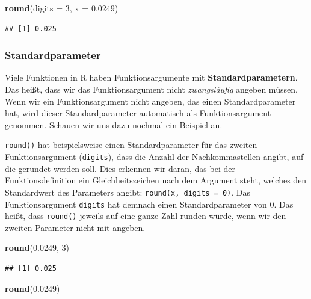 \documentclass[
  ngerman,
]{book}
\newenvironment{Shaded}{\begin{snugshade}}{\end{snugshade}}
\newcommand{\AttributeTok}[1]{\textcolor[rgb]{0.13,0.29,0.53}{#1}}
\newcommand{\DecValTok}[1]{\textcolor[rgb]{0.00,0.00,0.81}{#1}}
\newcommand{\FloatTok}[1]{\textcolor[rgb]{0.00,0.00,0.81}{#1}}
\newcommand{\FunctionTok}[1]{\textcolor[rgb]{0.13,0.29,0.53}{\textbf{#1}}}
\newcommand{\NormalTok}[1]{#1}
\begin{document}
\begin{Shaded}
\begin{Highlighting}[]
\FunctionTok{round}\NormalTok{(}\AttributeTok{digits =} \DecValTok{3}\NormalTok{, }\AttributeTok{x =} \FloatTok{0.0249}\NormalTok{)}
\end{Highlighting}
\end{Shaded}

\begin{verbatim}
## [1] 0.025
\end{verbatim}

\subsubsection{Standardparameter}\label{standardparameter}

Viele Funktionen in R haben Funktionsargumente mit \textbf{Standardparametern}. Das heißt, dass wir das Funktionsargument nicht \emph{zwangsläufig} angeben müssen. Wenn wir ein Funktionsargument nicht angeben, das einen Standardparameter hat, wird dieser Standardparameter automatisch als Funktionsargument genommen. Schauen wir uns dazu nochmal ein Beispiel an.

\texttt{round()} hat beispielsweise einen Standardparameter für das zweiten Funktionsargument (\texttt{digits}), dass die Anzahl der Nachkommastellen angibt, auf die gerundet werden soll. Dies erkennen wir daran, das bei der Funktionsdefinition ein Gleichheitszeichen nach dem Argument steht, welches den Standardwert des Parameters angibt: \texttt{round(x,\ digits\ =\ 0)}. Das Funktionsargument \texttt{digits} hat demnach einen Standardparameter von 0. Das heißt, dass \texttt{round()} jeweils auf eine ganze Zahl runden würde, wenn wir den zweiten Parameter nicht mit angeben.

\begin{Shaded}
\begin{Highlighting}[]
\FunctionTok{round}\NormalTok{(}\FloatTok{0.0249}\NormalTok{, }\DecValTok{3}\NormalTok{)}
\end{Highlighting}
\end{Shaded}

\begin{verbatim}
## [1] 0.025
\end{verbatim}

\begin{Shaded}
\begin{Highlighting}[]
\FunctionTok{round}\NormalTok{(}\FloatTok{0.0249}\NormalTok{)}
\end{Highlighting}
\end{Shaded}
\end{document}
